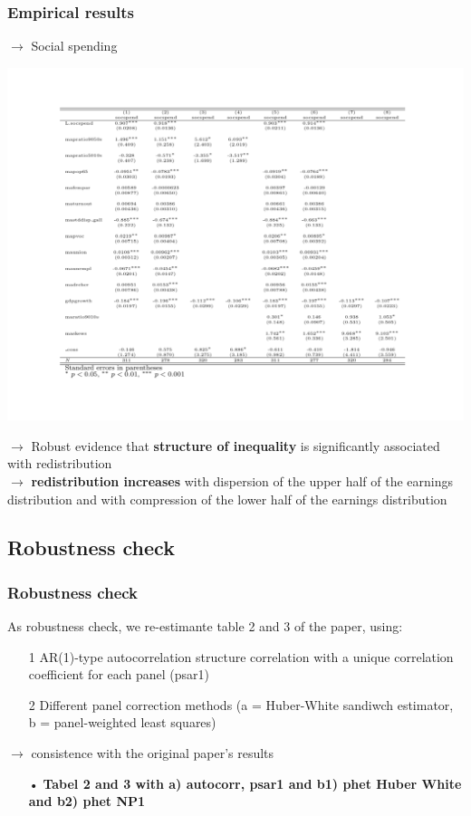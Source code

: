 \documentclass{beamer}
\begin{document}
\begin{frame}
\frametitle{Empirical results}
$\longrightarrow$ Social spending
\begin{center}
\includegraphics[scale=0.35]{tab3}
\end{center}
\end{frame}


\begin{frame}
$\longrightarrow$  Robust evidence that \textbf{structure of inequality} is significantly associated with redistribution\\
\medskip
\medskip
$\longrightarrow$ \textbf{redistribution increases} with dispersion of the upper half of the earnings distribution and with compression of the lower half of the earnings distribution
\end{frame}


\begin{frame}
\subsection{Robustness check} 
\frametitle{Robustness check}
As robustness check, we re-estimante table 2 and 3 of the paper, using:
\begin{itemize}
\item[1] AR(1)-type autocorrelation structure correlation with a unique correlation coefficient for each panel (psar1)
\item[2] Different panel correction methods (a = Huber-White sandiwch estimator, b = panel-weighted least squares) 
\end{itemize} 
\medskip
$\longrightarrow$  consistence with the original paper's results 
\medskip
\medskip
\begin{itemize} 
\item[•] \textbf{Tabel 2 and 3 with a) autocorr, psar1 and b1) phet Huber White and b2) phet NP1}
\end{itemize}
\end{frame}
\end{document}
